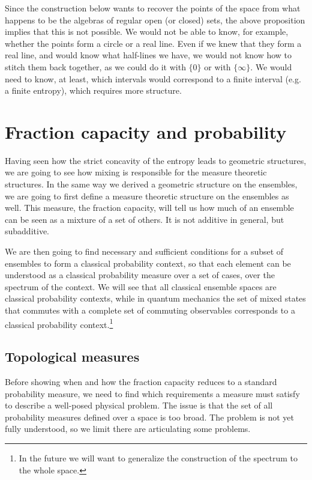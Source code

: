 Since the construction below wants to recover the points of the space from what happens to be the algebras of regular open (or closed) sets, the above proposition implies that this is not possible. We would not be able to know, for example, whether the points form a circle or a real line. Even if we knew that they form a real line, and would know what half-lines we have, we would not know how to stitch them back together, as we could do it with $\{0\}$ or with $\{\infty\}$. We would need to know, at least, which intervals would correspond to a finite interval (e.g. a finite entropy), which requires more structure.

\iftrue



\section{Fraction capacity and probability}

Having seen how the strict concavity of the entropy leads to geometric structures, we are going to see how mixing is responsible for the measure theoretic structures. In the same way we derived a geometric structure on the ensembles, we are going to first define a measure theoretic structure on the ensembles as well. This measure, the fraction capacity, will tell us how much of an ensemble can be seen as a mixture of a set of others. It is not additive in general, but subadditive.

We are then going to find necessary and sufficient conditions for a subset of ensembles to form a classical probability context, so that each element can be understood as a classical probability measure over a set of cases, over the spectrum of the context. We will see that all classical ensemble spaces are classical probability contexts, while in quantum mechanics the set of mixed states that commutes with a complete set of commuting observables corresponds to a classical probability context.\footnote{In the future we will want to generalize the construction of the spectrum to the whole space.}

\subsection{Topological measures}

Before showing when and how the fraction capacity reduces to a standard probability measure, we need to find which requirements a measure must satisfy to describe a well-posed physical problem. The issue is that the set of all probability measures defined over a space is too broad. The problem is not yet fully understood, so we limit there are articulating some problems.

